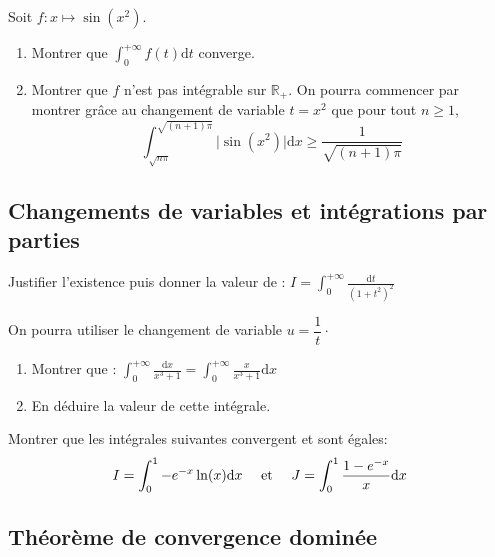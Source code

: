 \documentclass[a4paper,twoside,french,11pt]{VcCours}
\newcommand{\dx}{\text{d}x}
\newcommand{\dt}{\text{d}t}
\begin{document}
\begin{Exercice}{}
Soit $f : x \mapsto \sin(x^2)$.
\begin{enumerate}
\item Montrer que $\int_{0}^{+ \infty}  f(t) \dt$ converge.
\item Montrer que $f$ n'est pas intégrable sur $\mathbb{R}_+$. On pourra commencer par montrer grâce au changement de variable $t=x^2$ que pour tout $n \geq 1$,
$$ \int_{\sqrt{n \pi}}^{\sqrt{(n+1)\pi}} \vert \sin(x^2) \vert \dx \geq \frac{1}{\sqrt{(n+1) \pi}}$$
\end{enumerate}
\end{Exercice}

\subsection{Changements de variables et intégrations par parties}

\begin{Exercice}{} Justifier l'existence puis donner la valeur de :
$I = \int_{0}^{ + \infty} \frac{\dt}{(1 + t^{2})^{2}}$

On pourra utiliser le changement de variable $u = \dfrac{1}{t} \cdot$
\end{Exercice}

\begin{Exercice}{}
\begin{enumerate}
  \item
    Montrer que :
$\int_{0}^{ + \infty} \frac{\dx}{x^{3} + 1} = \int_{0}^{ + \infty} \frac{x}{x^{3} + 1}\dx$
  \item
    En déduire la valeur de cette intégrale.
  \end{enumerate}
\end{Exercice} 

\begin{Exercice}{} Montrer que les intégrales suivantes convergent et sont égales:
$$ I=\int_{0}^1 -e^{-x} \ln(x) \dx \quad \hbox{ et } \quad J= \int_{0}^1 \frac{1-e^{-x}}{x} \dx$$
\end{Exercice}

\subsection{Théorème de convergence dominée}
\end{document}
